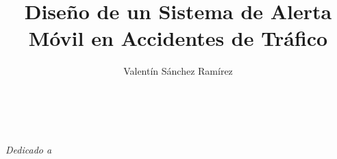 \documentclass[12pt,a4paper]{report}
\author{Valentín Sánchez Ramírez}
\title{Diseño de un Sistema de Alerta M\'ovil en Accidentes de Tr\'afico}
\begin{document}
	
	
	
	
	\newpage
	$\ $
	\thispagestyle{empty} 
	
	\chapter*{}
	
		\textit{Dedicado a	}
	
	
		
	
	
	
	
	
	
	
	
	
	
	
	
	
	
	
	
	
	
	
	
	
	
	
\end{document}
